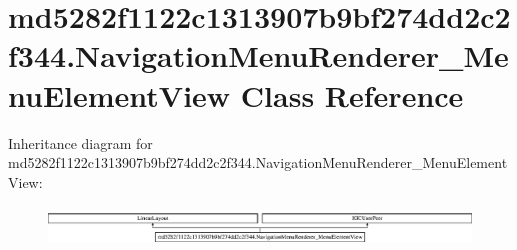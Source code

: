 \hypertarget{classmd5282f1122c1313907b9bf274dd2c2f344_1_1NavigationMenuRenderer__MenuElementView}{}\section{md5282f1122c1313907b9bf274dd2c2f344.\+Navigation\+Menu\+Renderer\+\_\+\+Menu\+Element\+View Class Reference}
\label{classmd5282f1122c1313907b9bf274dd2c2f344_1_1NavigationMenuRenderer__MenuElementView}
Inheritance diagram for md5282f1122c1313907b9bf274dd2c2f344.\+Navigation\+Menu\+Renderer\+\_\+\+Menu\+Element\+View\+:\begin{figure}[H]
\begin{center}
\leavevmode
\includegraphics[height=1.081081cm]{classmd5282f1122c1313907b9bf274dd2c2f344_1_1NavigationMenuRenderer__MenuElementView}
\end{center}
\end{figure}
